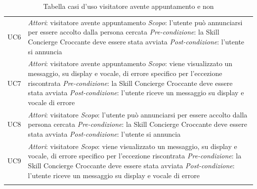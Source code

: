 \begin{center}
\begin{longtable}{  p{2.5cm} p{9.8cm} }
		UC6 &  \textit{Attori}: visitatore avente appuntamento \newline \textit{Scopo}: l'utente può annunciarsi per essere accolto dalla persona cercata \newline \textit{Pre-condizione}: la Skill Concierge Croccante deve essere stata avviata \newline \textit{Post-condizione}: l'utente si annuncia \\
		
		UC7 &  \textit{Attori}: visitatore avente appuntamento \newline \textit{Scopo}: viene visualizzato un messaggio, su display e vocale, di errore specifico per l'eccezione riscontrata \newline \textit{Pre-condizione}: la Skill Concierge Croccante deve essere stata avviata \newline \textit{Post-condizione}: l'utente riceve un messaggio su display e vocale di errore\\
		
		UC8 &  \textit{Attori}: visitatore  \newline \textit{Scopo}: l'utente può annunciarsi per essere accolto dalla persona cercata \newline \textit{Pre-condizione}: la Skill Concierge Croccante deve essere stata avviata \newline \textit{Post-condizione}: l'utente si annuncia \\
		
		UC9 &  \textit{Attori}: visitatore  \newline \textit{Scopo}: viene visualizzato un messaggio, su display e vocale, di errore specifico per l'eccezione riscontrata \newline \textit{Pre-condizione}: la Skill Concierge Croccante deve essere stata avviata \newline \textit{Post-condizione}: l'utente riceve un messaggio su display e vocale di errore\\
		
		\rowcolor{white}
		\caption{\label{tab:UC_persona}Tabella casi d'uso visitatore avente appuntamento e non}
	\end{longtable}
\end{center}
